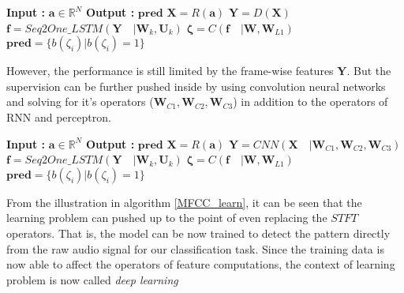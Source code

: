 \begin{algorithm}
  \caption{$\textbf{pred}$ = $Model$($\textbf{a}$) }\label{abstraction2}
  \begin{algorithmic}[1]
    \Statex \textbf{Input :} $\textbf{a} \in \mathbb{R}^{N}$
    \Statex \textbf{Output :} $\textbf{pred}$ 
    \State $\textbf{X} = R(\textbf{a})$ 
    \State $\textbf{Y} = D(\textbf{X})$ 
    \State $\textbf{f} = Seq2One\_LSTM(\textbf{Y} \quad | \textbf{W}_{k}, \textbf{U}_{k})$ 
    \State $\bm{\zeta} = C(\textbf{f} \quad |\textbf{W},\textbf{W}_{L1})$ 
    \State $\textbf{pred} = \{ b(\zeta_{i}) | b(\zeta_{i}) = 1 \}$ 
  \end{algorithmic}
\end{algorithm}
\FloatBarrier
\noindent However, the performance is still limited by the frame-wise features $\textbf{Y}$. But the supervision can be further pushed inside by using convolution neural networks and solving for it's operators ($\textbf{W}_{C1}, \textbf{W}_{C2}, \textbf{W}_{C3}$) in addition to the operators of RNN and perceptron.
\begin{algorithm}
  \caption{$\textbf{pred}$ = $Model$($\textbf{a}$) }\label{abstraction3}
  \begin{algorithmic}[1]
    \Statex \textbf{Input :} $\textbf{a} \in \mathbb{R}^{N}$
    \Statex \textbf{Output :} $\textbf{pred}$ 
    \State $\textbf{X} = R(\textbf{a})$ 
    \State $\textbf{Y} = CNN(\textbf{X} \quad | \textbf{W}_{C1}, \textbf{W}_{C2}, \textbf{W}_{C3})$ 
    \State $\textbf{f} = Seq2One\_LSTM(\textbf{Y} \quad | \textbf{W}_{k}, \textbf{U}_{k})$ 
    \State $\bm{\zeta} = C(\textbf{f} \quad |\textbf{W},\textbf{W}_{L1})$ 
    \State $\textbf{pred} = \{ b(\zeta_{i}) | b(\zeta_{i}) = 1 \}$ 
  \end{algorithmic}
\end{algorithm}
\FloatBarrier
\noindent From the illustration in algorithm \ref{MFCC_learn}, it can be seen that the learning problem can pushed up to the point of even replacing the $STFT$ operators. That is, the model can be now trained to detect the pattern directly from the raw audio signal for our classification task. Since the training data is now able to affect the operators of feature computations, the context of learning problem is now called \textit{deep learning} 

